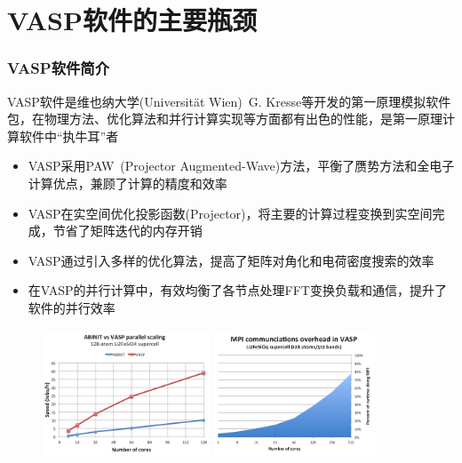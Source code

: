 \section{\rm{VASP}软件的主要瓶颈}
\frame
{
	\frametitle{\textrm{VASP}软件简介}
	\textrm{VASP}软件是维也纳大学\textrm{(Universit\"at Wien)}~\textrm{G. Kresse}等开发的第一原理模拟软件包，在物理方法、优化算法和并行计算实现等方面都有出色的性能，是第一原理计算软件中``执牛耳''者
	\begin{itemize}
\fontsize{7.2pt}{5.2pt}\selectfont
		\item \textrm{VASP}采用\textrm{PAW~(Projector Augmented-Wave)}方法，平衡了赝势方法和全电子计算优点，兼顾了计算的精度和效率
		\item \textrm{VASP}在实空间优化投影函数\textrm{(Projector)}，将主要的计算过程变换到实空间完成，节省了矩阵迭代的内存开销%
		\item \textrm{VASP}通过引入多样的优化算法，提高了矩阵对角化和电荷密度搜索的效率
		\item 在\textrm{VASP}的并行计算中，有效均衡了各节点处理\textrm{FFT}变换负载和通信，提升了软件的并行效率
	\end{itemize}
\begin{figure}[h!]
	\vspace{-0.25in}
\centering
\includegraphics[height=1.50in,width=1.95in,viewport=0 0 240 200,clip]{Figures/VASP-abinit_Li128-2.png}
\includegraphics[height=1.50in,width=1.90in,viewport=0 0 240 200,clip]{Figures/VASP-mpi-Li128.png}
\label{ABINIT_vs_VASP-1}
\end{figure} 
}

